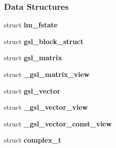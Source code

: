 \subsubsection*{Data Structures}
\begin{CompactItemize}
\item 
struct {\bf lm\_\-fstate}
\item 
struct \textbf{gsl\_\-block\_\-struct}
\item 
struct \textbf{gsl\_\-matrix}
\item 
struct \textbf{\_\-gsl\_\-matrix\_\-view}
\item 
struct \textbf{gsl\_\-vector}
\item 
struct \textbf{\_\-gsl\_\-vector\_\-view}
\item 
struct \textbf{\_\-gsl\_\-vector\_\-const\_\-view}
\item 
struct {\bf complex\_\-t}
\end{CompactItemize}
